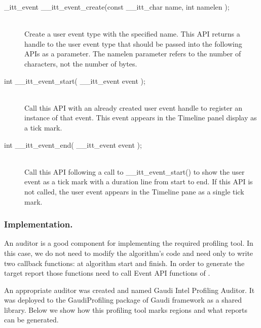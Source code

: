 \begin{description}
\item[\_itt\_event \_\_itt\_event\_create(const \_\_itt\_char \*name, int namelen );] \hfill \\
Create a user event type with the specified name. This API returns a handle to the user event type that should be 
passed into the following APIs as a parameter. The namelen parameter refers to the number of characters, 
not the number of bytes.

\item[int \_\_itt\_event\_start( \_\_itt\_event event );] \hfill \\
Call this API with an already created user event handle to register an instance of that event. This event appears 
in the Timeline panel display as a tick mark.

\item[int \_\_itt\_event\_end( \_\_itt\_event event );] \hfill \\
Call this API following a call to \_\_itt\_event\_start() to show the user event as a tick mark with a duration line 
from start to end. If this API is not called, the user event appears in the Timeline pane as a single tick mark.
\end{description}

\subsubsection{Implementation.}

An auditor is a good component for implementing the required profiling tool. In
this case, we do not need to modify the algorithm’s code and need only to write
two callback functions: at algorithm start and finish. In order to generate the
target report those functions need to call Event API functions of \amp.

An appropriate auditor was created and named Gaudi Intel Profiling Auditor. It
was deployed to the GaudiProfiling package of Gaudi framework as a shared
library. Below we show how this profiling tool marks regions and what reports
can be generated.

